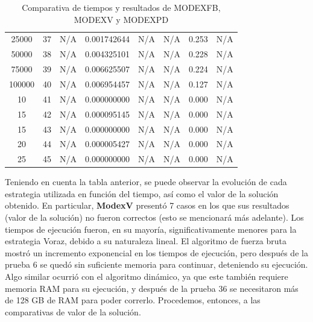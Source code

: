 \documentclass[letterpaper,10pt]{article}
\begin{document}
\begin{table}[H]
{\begin{tabular}{|c|c|c|c|c|c|c|c|}
      25000 & 37  & N/A        & \cellcolor{sgreen}0.001742644 & N/A & N/A    & \cellcolor{syellow}0.253  & N/A    \\
      50000 & 38  & N/A        & \cellcolor{sgreen}0.004325101 & N/A & N/A    & \cellcolor{syellow}0.228  & N/A    \\
      75000 & 39  & N/A        & \cellcolor{sgreen}0.006625507 & N/A & N/A    & \cellcolor{syellow}0.224  & N/A    \\
      100000 & 40 & N/A        & \cellcolor{sgreen}0.006954457 & N/A & N/A    & \cellcolor{syellow}0.127  & N/A    \\
      10   & 41   & N/A        & \cellcolor{sgreen}0.000000000 & N/A & N/A    & \cellcolor{syellow}0.000  & N/A    \\
      15   & 42   & N/A        & \cellcolor{sgreen}0.000095145 & N/A & N/A    & \cellcolor{syellow}0.000  & N/A    \\
      15   & 43   & N/A        & \cellcolor{sgreen}0.000000000 & N/A & N/A    & \cellcolor{syellow}0.000  & N/A    \\
      20   & 44   & N/A        & \cellcolor{sgreen}0.000005427 & N/A & N/A    & \cellcolor{syellow}0.000  & N/A    \\
      25   & 45   & N/A        & \cellcolor{sgreen}0.000000000 & N/A & N/A    & \cellcolor{syellow}0.000  & N/A    \\
      \hline
  \end{tabular}
  }
  \caption{Comparativa de tiempos y resultados de MODEXFB, MODEXV y MODEXPD}
  \label{tab:modex_comparativa}
\end{table}

Teniendo en cuenta la tabla anterior, se puede observar la evolución de cada estrategia utilizada en función del tiempo, así como el valor de la solución obtenido. En particular, \textbf{ModexV} presentó 7 casos en los que sus resultados (valor de la solución) no fueron correctos (esto se mencionará más adelante). Los tiempos de ejecución fueron, en su mayoría, significativamente menores para la estrategia Voraz, debido a su naturaleza lineal. El algoritmo de fuerza bruta mostró un incremento exponencial en los tiempos de ejecución, pero después de la prueba 6 se quedó sin suficiente memoria para continuar, deteniendo su ejecución. Algo similar ocurrió con el algoritmo dinámico, ya que este también requiere memoria RAM para su ejecución, y después de la prueba 36 se necesitaron más de 128 GB de RAM para poder correrlo. Procedemos, entonces, a las comparativas de valor de la solución.
\end{document}
